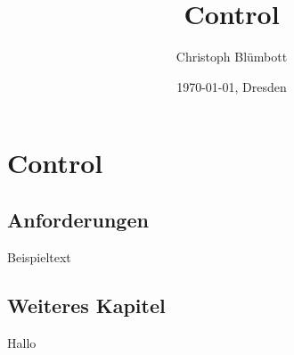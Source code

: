 \documentclass[../documentation.tex]{subfiles}
\title{Control}
\author{Christoph Blümbott}
\date{\today{}, Dresden}
\begin{document}
\onlyinsubfile{\maketitle\tableofcontents}
\section{Control}

\subsection{Anforderungen}
\label{sec:anforderungen}

Beispieltext

\subsection{Weiteres Kapitel}
\label{sec:weitereskapitel}

Hallo
\end{document}
